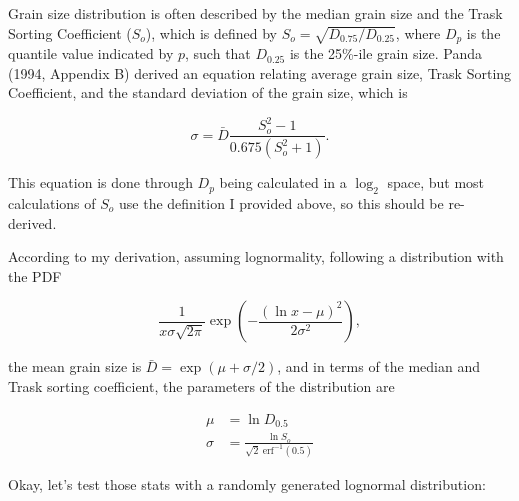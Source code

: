 \documentclass[]{article}
\begin{document}
Grain size distribution is often described by the median grain size and
the Trask Sorting Coefficient (\(S_o\)), which is defined by
\(S_o=\sqrt{D_{0.75}/D_{0.25}}\), where \(D_p\) is the quantile value
indicated by \(p\), such that \(D_{0.25}\) is the 25\%-ile grain size.
Panda (1994, Appendix B) derived an equation relating average grain
size, Trask Sorting Coefficient, and the standard deviation of the grain
size, which is

\begin{equation}
\sigma = \bar{D} \frac{S_o^2-1}{0.675\left(S_o^2+1\right)}.
\end{equation}

This equation is done through \(D_p\) being calculated in a \(\log_2\)
space, but most calculations of \(S_o\) use the definition I provided
above, so this should be re-derived.

According to my derivation, assuming lognormality, following a
distribution with the PDF

\begin{equation}
\frac{1}{x\sigma\sqrt{2\pi}} \exp\left(-\frac{(\ln x-\mu)^2}{2\sigma^2} \right),
\end{equation}

the mean grain size is \(\bar{D} = \exp(\mu + \sigma/2)\), and in terms
of the median and Trask sorting coefficient, the parameters of the
distribution are

\begin{align}
\mu &= \ln D_{0.5}\\
\sigma &= \frac{\ln S_o}{\sqrt{2}\ \text{erf}^{-1}(0.5)}
\end{align}

Okay, let's test those stats with a randomly generated lognormal
distribution:
\end{document}
